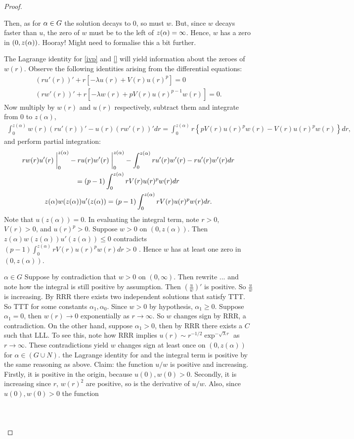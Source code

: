 \begin{lemma}
\begin{proof}
\begin{outlines}
      \2 Then, as for $\alpha\in G$ the solution decays to 0, so must $w$.
      \2 But, since $w$ decays faster than $u$, the zero of $w$ must be to the left of $z(\alpha)=\infty$.
      \2 Hence, $w$ has a zero in $(0,z(\alpha))$.
        \3 Hooray!
    \1 Might need to formalise this a bit further.
  \end{outlines}
The Lagrange identity for \ref{ivp} and \ref{} will yield information about the zeroes of $w(r)$. Observe the following identities arising from the differential equations:\begin{gather*}
(ru'(r))'+r\left[-\lambda u(r)+V(r)u(r)^p\right]=0\\
(rw'(r))'+r\left[-\lambda w(r)+pV(r)u(r)^{p-1}w(r)\right]=0.
\end{gather*} Now multiply by $w(r)$ and $u(r)$ respectively, subtract them and integrate from 0 to $z(\alpha)$, \begin{gather*}
\int_0^{z(\alpha)}w(r)(ru'(r))'-u(r)(rw'(r))'dr=%
\int_0^{z(\alpha)}r\left\{pV(r)u(r)^pw(r)-V(r)u(r)^pw(r)\right\}dr,
\end{gather*} and perform partial integration:\begin{gather*}
rw(r)u'(r)\at_0^{z(\alpha)}-ru(r)w'(r)\at_0^{z(\alpha)}-\int_0^{z(\alpha)}ru'(r)w'(r)-ru'(r)w'(r)dr\\=(p-1)\int_0^{z(\alpha)}rV(r)u(r)^pw(r)dr\\z(\alpha)w(z(\alpha))u'(z(\alpha))=(p-1)\int_0^{z(\alpha)}rV(r)u(r)^pw(r)dr.
\end{gather*} Note that $u(z(\alpha))=0$.   In evaluating the integral term, {\color{gray}note $r>0$, $V(r)>0$, and $u(r)^p>0$. Suppose $w>0$ on $(0,z(\alpha))$. Then $z(\alpha)w(z(\alpha))u'(z(\alpha))\leq0$ contradicts $(p-1)\int_0^{z(\alpha)}rV(r)u(r)^pw(r)dr>0$ \Lightning. Hence $w$ has at least one zero in $(0,z(\alpha))$.}

\underline{$\alpha\in G$} Suppose by contradiction that $w>0$ on $(0,\infty)$. {\color{gray} Then rewrite ... and note how the integral is still positive by assumption. Then $\left(\frac{u}{w}\right)'$ is positive. So $\frac{u}{w}$ is increasing. By RRR there exists two independent solutions that satisfy TTT. So TTT for some constants $\alpha_1,\alpha_0$. Since $w>0$ by hypothesis, $\alpha_1\geq0$. Suppose $\alpha_1=0$, then $w(r)\to0$ exponentially as $r\to\infty$. So $w$ changes sign by RRR, a contradiction. On the other hand, suppose $\alpha_1>0$, then by RRR there exists a $C$ such that LLL. To see this, note how RRR implies $u(r)\sim r^{-1/2}\exp^{-\sqrt{\lambda}r}$ as $r\to\infty$. These contradictions yield $w$ changes sign at least once on $(0,z(\alpha))$ for $\alpha\in(G\cup N)$.} the Lagrange identity for and the integral term is positive by the same reasoning as above. Claim: the function $u/w$ is positive and increasing. Firstly, it is positive in the origin, because $u(0),w(0)>0$. Secondly, it is increasing since $r$, $w(r)^2$ are positive, so is the derivative of $u/w$. Also, since $u(0),w(0)>0$ the function \\ \\
\underline{}\\ \\
\underline{}
\end{proof}
\end{lemma}
